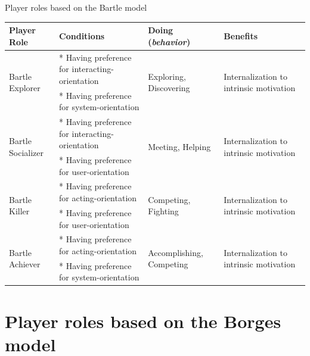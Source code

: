 \begin{quadro}[htb] \scriptsize
\caption{Player roles based on the Bartle model \cite{Bartle2004}}

\begin{tabular}{|p{2cm}|l|p{2.5cm}|p{2.5cm}|} \hline
Player Role & Conditions & Doing (\emph{behavior}) & Benefits \\
\hline
\multirow{2}{2cm}{Bartle Explorer} &
* Having preference for interacting-orientation &
\multirow{2}{2.5cm}{Exploring, Discovering} &
\multirow{2}{2.5cm}{Internalization to intrinsic motivation} \\
 & * Having preference for system-orientation & & \\
\hline

\multirow{2}{2cm}{Bartle Socializer} &
* Having preference for interacting-orientation &
\multirow{2}{2.5cm}{Meeting, Helping} &
\multirow{2}{2.5cm}{Internalization to intrinsic motivation} \\
 & * Having preference for user-orientation & & \\
\hline

\multirow{2}{2cm}{Bartle Killer} &
* Having preference for acting-orientation &
\multirow{2}{2.5cm}{Competing, Fighting} &
\multirow{2}{2.5cm}{Internalization to intrinsic motivation} \\
 & * Having preference for user-orientation & & \\
\hline

\multirow{2}{2cm}{Bartle Achiever} &
* Having preference for acting-orientation &
\multirow{2}{2.5cm}{Accomplishing, Competing} &
\multirow{2}{2.5cm}{Internalization to intrinsic motivation} \\
 & * Having preference for system-orientation & & \\
\hline

\end{tabular}

\end{quadro}


\section{Player roles based on the Borges model}
\label{sec:player-roles-based-borges}

